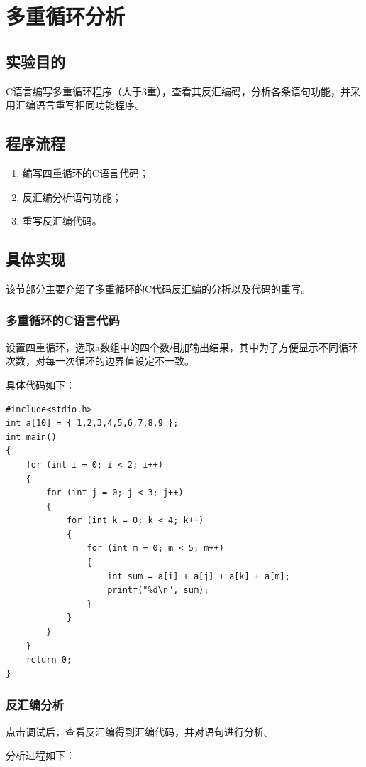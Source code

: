 \chapter{多重循环分析}

\section{实验目的}
C语言编写多重循环程序（大于3重），查看其反汇编码，分析各条语句功能，并采用汇编语言重写相同功能程序。

\section{程序流程}
\begin{enumerate}
    \item 编写四重循环的C语言代码；
    \item 反汇编分析语句功能；
    \item 重写反汇编代码。
\end{enumerate}

\section{具体实现}
该节部分主要介绍了多重循环的C代码反汇编的分析以及代码的重写。
\subsection{多重循环的C语言代码}
设置四重循环，选取a数组中的四个数相加输出结果，其中为了方便显示不同循环次数，对每一次循环的边界值设定不一致。

具体代码如下：
\begin{lstlisting}
#include<stdio.h>
int a[10] = { 1,2,3,4,5,6,7,8,9 };
int main()
{
    for (int i = 0; i < 2; i++)
    {
        for (int j = 0; j < 3; j++)
        {
            for (int k = 0; k < 4; k++)
            {
                for (int m = 0; m < 5; m++)
                {
                    int sum = a[i] + a[j] + a[k] + a[m];
                    printf("%d\n", sum);
                }
            }
        }
    }
    return 0;
}
\end{lstlisting}

\subsection{反汇编分析}
点击调试后，查看反汇编得到汇编代码，并对语句进行分析。

分析过程如下：
